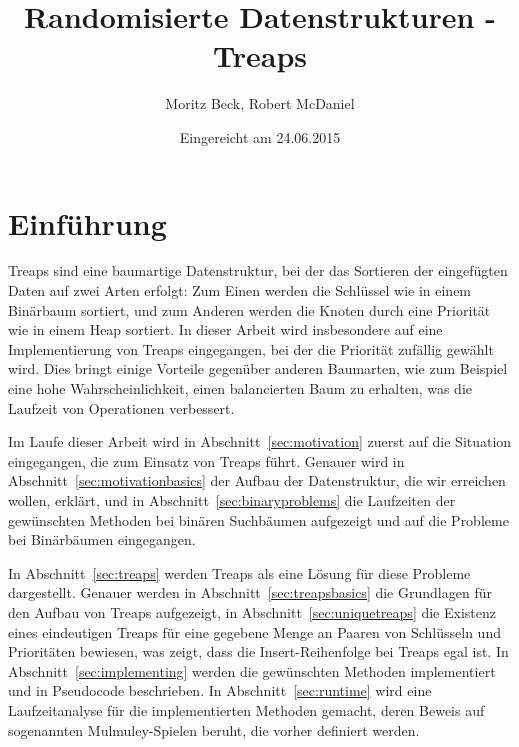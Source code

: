 \documentclass[a4paper]{scrreprt}
\theoremstyle{definition}
\begin{document}

\subject{Seminararbeit}
\title{Randomisierte Datenstrukturen - Treaps}
\author{Moritz Beck, Robert McDaniel}
\date{Eingereicht am 24.06.2015}
\titlehead{Julius-Maximilians-Universität Würzburg\\
Institut für Informatik\\
Lehrstuhl für Informatik I\\
Effiziente Algorithmen und wissensbasierte Systeme}
\publishers{Betreuer:\\
Prof.\ Dr.\ Alexander Wolff\\
Dr.\ Philipp Kindermann}
\maketitle
\tableofcontents


\chapter{Einführung}
\label{sec:intro}

Treaps sind eine baumartige Datenstruktur, bei der das Sortieren der eingefügten Daten auf zwei Arten erfolgt:
Zum Einen werden die Schlüssel wie in einem Binärbaum sortiert, und zum Anderen werden die Knoten durch eine Priorität wie in einem Heap sortiert.
In dieser Arbeit wird insbesondere auf eine Implementierung von Treaps eingegangen, bei der die Priorität zufällig gewählt wird.
Dies bringt einige Vorteile gegenüber anderen Baumarten, wie zum Beispiel eine hohe Wahrscheinlichkeit, einen balancierten Baum zu erhalten, was die Laufzeit von Operationen verbessert.

Im Laufe dieser Arbeit wird in Abschnitt~\ref{sec:motivation} zuerst auf die Situation eingegangen, die zum Einsatz von Treaps führt.
Genauer wird in Abschnitt~\ref{sec:motivationbasics} der Aufbau der Datenstruktur, die wir erreichen wollen, erklärt, und in Abschnitt~\ref{sec:binaryproblems} die Laufzeiten der gewünschten Methoden bei binären Suchbäumen aufgezeigt und auf die Probleme bei Binärbäumen eingegangen.

In Abschnitt~\ref{sec:treaps} werden Treaps als eine Lösung für diese Probleme dargestellt.
Genauer werden in Abschnitt~\ref{sec:treapsbasics} die Grundlagen für den Aufbau von Treaps aufgezeigt, in Abschnitt~\ref{sec:uniquetreaps} die Existenz eines eindeutigen Treaps für eine gegebene Menge an Paaren von Schlüsseln und Prioritäten bewiesen, was zeigt, dass die Insert-Reihenfolge bei Treaps egal ist.
In Abschnitt~\ref{sec:implementing} werden die gewünschten Methoden implementiert und in Pseudocode beschrieben.
In Abschnitt~\ref{sec:runtime} wird eine Laufzeitanalyse für die implementierten Methoden gemacht, deren Beweis auf sogenannten Mulmuley-Spielen beruht, die vorher definiert werden.
\end{document}
